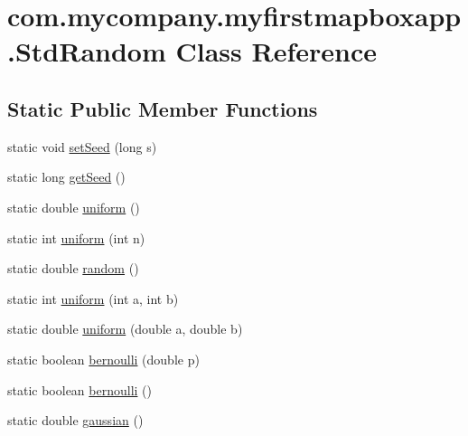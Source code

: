 \hypertarget{classcom_1_1mycompany_1_1myfirstmapboxapp_1_1_std_random}{}\section{com.\+mycompany.\+myfirstmapboxapp.\+Std\+Random Class Reference}
\label{classcom_1_1mycompany_1_1myfirstmapboxapp_1_1_std_random}
\subsection*{Static Public Member Functions}
\begin{DoxyCompactItemize}
\item 
static void \hyperlink{classcom_1_1mycompany_1_1myfirstmapboxapp_1_1_std_random_ad19c856e85e391ed6ea1d593449503a2}{set\+Seed} (long s)
\item 
static long \hyperlink{classcom_1_1mycompany_1_1myfirstmapboxapp_1_1_std_random_adfe11edf9ca1cc8dfe40834767710da5}{get\+Seed} ()
\item 
static double \hyperlink{classcom_1_1mycompany_1_1myfirstmapboxapp_1_1_std_random_affb3ca5a5bdc0eb1f1fcdc0d536eddaf}{uniform} ()
\item 
static int \hyperlink{classcom_1_1mycompany_1_1myfirstmapboxapp_1_1_std_random_a0b9d97c0c7f8f096ef80a9bb35375b97}{uniform} (int n)
\item 
static double \hyperlink{classcom_1_1mycompany_1_1myfirstmapboxapp_1_1_std_random_a53662c3ead473d564aeb863633814a16}{random} ()
\item 
static int \hyperlink{classcom_1_1mycompany_1_1myfirstmapboxapp_1_1_std_random_a6bcc5574e398d062f6a31f8374a49cbc}{uniform} (int a, int b)
\item 
static double \hyperlink{classcom_1_1mycompany_1_1myfirstmapboxapp_1_1_std_random_aae7af5e1b72e59f6599aec09d1929e25}{uniform} (double a, double b)
\item 
static boolean \hyperlink{classcom_1_1mycompany_1_1myfirstmapboxapp_1_1_std_random_a34585a3fcc8fc048d638201c84db1848}{bernoulli} (double p)
\item 
static boolean \hyperlink{classcom_1_1mycompany_1_1myfirstmapboxapp_1_1_std_random_a73c78d568b6155babc555c43c1b1dcf4}{bernoulli} ()
\item 
static double \hyperlink{classcom_1_1mycompany_1_1myfirstmapboxapp_1_1_std_random_ace5c3c0010e2e56808629057bcb888ba}{gaussian} ()
\item 

\end{DoxyCompactItemize}
